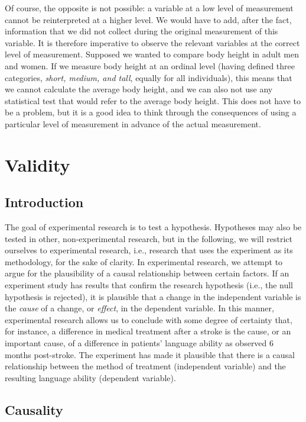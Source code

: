 \documentclass[
]{book}
\begin{document}
Of course, the opposite is not possible: a variable at a low level of measurement cannot be reinterpreted at a higher level. We would have to add, after the fact, information that we did not collect during the original measurement of this variable. It is therefore imperative to observe the relevant variables at the correct level of measurement. Supposed we wanted to compare body height in adult men and women. If we measure body height at an ordinal level (having defined three categories, \emph{short, medium, and tall}, equally for all individuals), this means that we cannot calculate the average body height, and we can also not use any statistical test that would refer to the average body height. This does not have to be a problem, but it is a good idea to think through the consequences of using a particular level of measurement in advance of the actual measurement.

\chapter{Validity}\label{ch-validity}

\section{Introduction}\label{introduction-2}

The goal of experimental research is to test a hypothesis. Hypotheses may also be tested in other, non-experimental research, but in the following, we will restrict ourselves to experimental research, i.e., research that uses the experiment as its methodology, for the sake of clarity. In experimental research, we attempt to argue for the plausibility of a causal relationship between certain factors. If an experiment study has results that confirm the research hypothesis (i.e., the null hypothesis is rejected), it is plausible that a change in the independent variable is the \emph{cause} of a change, or \emph{effect}, in the dependent variable. In this manner, experimental research allows us to conclude with some degree of certainty that, for instance, a difference in medical treatment after a stroke is the cause, or an important cause, of a difference in patients' language ability as observed 6 months post-stroke. The experiment has made it plausible that there is a causal relationship between the method of treatment (independent variable) and the resulting language ability (dependent variable).

\section{Causality}\label{sec:causality}
\end{document}
